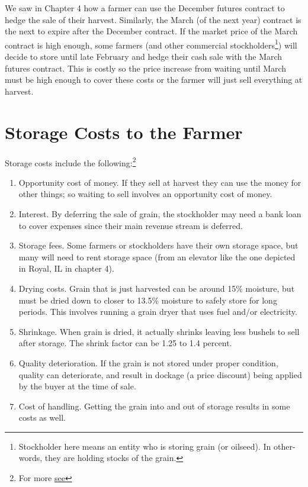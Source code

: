 \documentclass[
  letterpaper,
  DIV=11,
  numbers=noendperiod]{scrreprt}
\providecommand{\tightlist}{%
  \setlength{\itemsep}{0pt}\setlength{\parskip}{0pt}}\usepackage{longtable,booktabs,array}
\begin{document}
We saw in Chapter 4 how a farmer can use the December futures contract
to hedge the sale of their harvest. Similarly, the March (of the next
year) contract is the next to expire after the December contract. If the
market price of the March contract is high enough, some farmers (and
other commercial stockholders\footnote{Stockholder here means an entity
  who is storing grain (or oilseed). In other-words, they are holding
  stocks of the grain.}) will decide to store until late February and
hedge their cash sale with the March futures contract. This is costly so
the price increase from waiting until March must be high enough to cover
these costs or the farmer will just sell everything at harvest.

\section{Storage Costs to the Farmer}\label{storage-costs-to-the-farmer}

Storage costs include the following:\footnote{For more
  \href{https://www.extension.iastate.edu/agdm/crops/pdf/a2-33.pdf}{see}}

\begin{enumerate}
\def\labelenumi{\arabic{enumi}.}
\tightlist
\item
  Opportunity cost of money. If they sell at harvest they can use the
  money for other things; so waiting to sell involves an opportunity
  cost of money.
\item
  Interest. By deferring the sale of grain, the stockholder may need a
  bank loan to cover expenses since their main revenue stream is
  deferred.
\item
  Storage fees. Some farmers or stockholders have their own storage
  space, but many will need to rent storage space (from an elevator like
  the one depicted in Royal, IL in chapter 4).
\item
  Drying costs. Grain that is just harvested can be around 15\%
  moisture, but must be dried down to closer to 13.5\% moisture to
  safely store for long periods. This involves running a grain dryer
  that uses fuel and/or electricity.
\item
  Shrinkage. When grain is dried, it actually shrinks leaving less
  bushels to sell after storage. The shrink factor can be 1.25 to 1.4
  percent.
\item
  Quality deterioration. If the grain is not stored under proper
  condition, quality can deteriorate, and result in dockage (a price
  discount) being applied by the buyer at the time of sale.
\item
  Cost of handling. Getting the grain into and out of storage results in
  some costs as well.
\end{enumerate}
\end{document}
